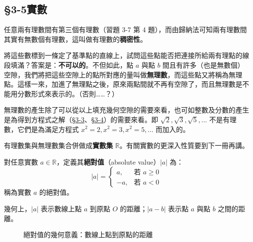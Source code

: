 \subsection{\S 3-5\quad 實數}\label{sec:3-5}

任意兩有理數間有第三個有理數（習題 3-7 第 4 題），而由歸納法可知兩有理數間其實有無數個有理數，這叫做有理數的\textbf{稠密性}。

將這些數標到一條定了基準點的直線上，試問這些點能否把連接所給兩有理點的線段填滿？答案是：\textbf{不可以的}。不但如此，點 $a$ 與點 $b$ 間且有許多（也是無數個）空隙，我們將把這些空隙上的點所對應的量叫做\textbf{無理數}，而這些點又將稱為無理點。這樣一來，加進了無理點之後，原來兩點間就不再有空隙了，而且無理數是不能用分數形式來表示的。（否則……？）

無理數的產生除了可以從以上填充幾何空隙的需要來看，也可如整數及分數的產生是為得到方程式之解（\hyperref[sec:3-3]{\S 3-3}、\hyperref[sec:3-4]{\S 3-4}）的需要來看。即 $\sqrt{2}, \sqrt{3}, \sqrt{5}, \dots$ 不是有理數，它們是為滿足方程式 $x^2 = 2, x^2 = 3, x^2 = 5, \dots$ 而加入的。

有理數集與無理數集合併做成\textbf{實數集} $\mathbb{R}$。有關實數的更深入性質要到下一冊再講。

\begin{definition}[絕對值]\label{def:abs_value}
對任意實數 $a \in \mathbb{R}$，定義其\textbf{絕對值}（absolute value）$|a|$ 為：
\begin{equation}\label{eq:abs_definition}
  |a| = \begin{cases}
    a, & \text{若 } a \ge 0 \\
    -a, & \text{若 } a < 0
  \end{cases}
\end{equation}
稱為實數 $a$ 的絕對值。
\end{definition}

幾何上，$|a|$ 表示數線上點 $a$ 到原點 $O$ 的距離；$|a - b|$ 表示點 $a$ 與點 $b$ 之間的距離。

\begin{figure}[htbp]
\centering
{}
\caption{絕對值的幾何意義：數線上點到原點的距離}\label{fig:abs_dist}
\end{figure}

